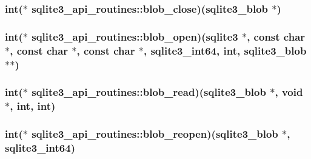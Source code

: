 \hypertarget{structsqlite3__api__routines_a7b7749cb4e412443b7903205c0ebacf2}{
\subsubsection[{blob\-\_\-close}]{\setlength{\rightskip}{0pt plus 5cm}int($\ast$ sqlite3\-\_\-api\-\_\-routines\-::blob\-\_\-close)({\bf sqlite3\-\_\-blob} $\ast$)}}\label{structsqlite3__api__routines_a7b7749cb4e412443b7903205c0ebacf2}
\hypertarget{structsqlite3__api__routines_abec3f9100c800aaac49c7eb881f24d4c}{
\subsubsection[{blob\-\_\-open}]{\setlength{\rightskip}{0pt plus 5cm}int($\ast$ sqlite3\-\_\-api\-\_\-routines\-::blob\-\_\-open)({\bf sqlite3} $\ast$, const char $\ast$, const char $\ast$, const char $\ast$, {\bf sqlite3\-\_\-int64}, int, {\bf sqlite3\-\_\-blob} $\ast$$\ast$)}}\label{structsqlite3__api__routines_abec3f9100c800aaac49c7eb881f24d4c}
\hypertarget{structsqlite3__api__routines_a916f53dfaedab13e9fcf33c80b10c341}{
\subsubsection[{blob\-\_\-read}]{\setlength{\rightskip}{0pt plus 5cm}int($\ast$ sqlite3\-\_\-api\-\_\-routines\-::blob\-\_\-read)({\bf sqlite3\-\_\-blob} $\ast$, void $\ast$, int, int)}}\label{structsqlite3__api__routines_a916f53dfaedab13e9fcf33c80b10c341}
\hypertarget{structsqlite3__api__routines_aa908e25dd18c6a891a767eec620484e5}{
\subsubsection[{blob\-\_\-reopen}]{\setlength{\rightskip}{0pt plus 5cm}int($\ast$ sqlite3\-\_\-api\-\_\-routines\-::blob\-\_\-reopen)({\bf sqlite3\-\_\-blob} $\ast$, {\bf sqlite3\-\_\-int64})}}\label{structsqlite3__api__routines_aa908e25dd18c6a891a767eec620484e5}
